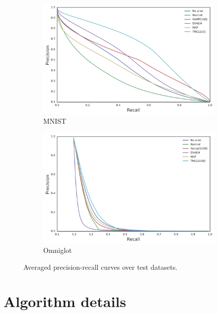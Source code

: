 \begin{figure}
\centering
\begin{subfigure}[h]{0.4\textwidth}
    \centering
    \includegraphics[width=\textwidth]{img/loracs/mnist/ir-mnist-joint.png}
    \caption{MNIST}
\end{subfigure}
\begin{subfigure}[h]{0.4\textwidth}
    \centering
    \includegraphics[width=\textwidth]{img/loracs/omniglot/ir-omniglot-joint.png}
    \caption{Omniglot}
\end{subfigure}
\caption{Averaged precision-recall curves over test datasets.}
\label{fig:prec-rec}
\end{figure}

\section{Algorithm details}
\label{sec:algorithm-details}

